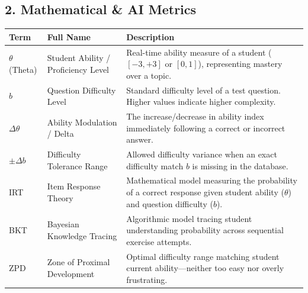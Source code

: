 \documentclass[12pt,a4paper]{article}
\begin{document}
\subsection*{2. Mathematical \& AI Metrics}
\begin{table}[H]
\centering
\small
\renewcommand{\arraystretch}{1.3}
\begin{tabularx}{\textwidth}{p{2.4cm} p{4.4cm} X}
\toprule
\textbf{Term} & \textbf{Full Name} & \textbf{Description} \\
\midrule
$\theta$ (Theta) & Student Ability / Proficiency Level & Real-time ability measure of a student ($[-3, +3]$ or $[0, 1]$), representing mastery over a topic. \\
\addlinespace[0.3em]
$b$ & Question Difficulty Level & Standard difficulty level of a test question. Higher values indicate higher complexity. \\
\addlinespace[0.3em]
$\Delta\theta$ & Ability Modulation / Delta & The increase/decrease in ability index immediately following a correct or incorrect answer. \\
\addlinespace[0.3em]
$\pm\Delta b$ & Difficulty Tolerance Range & Allowed difficulty variance when an exact difficulty match $b$ is missing in the database. \\
\addlinespace[0.3em]
IRT & Item Response Theory & Mathematical model measuring the probability of a correct response given student ability ($\theta$) and question difficulty ($b$). \\
\addlinespace[0.3em]
BKT & Bayesian Knowledge Tracing & Algorithmic model tracing student understanding probability across sequential exercise attempts. \\
\addlinespace[0.3em]
ZPD & Zone of Proximal Development & Optimal difficulty range matching student current ability---neither too easy nor overly frustrating. \\
\bottomrule
\end{tabularx}
\end{table}
\end{document}
